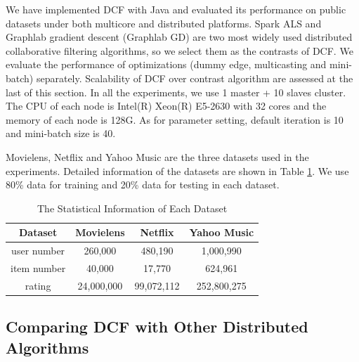 \documentclass{llncs}
\begin{document}
We have implemented DCF with Java and evaluated its performance on public datasets under both multicore and distributed platforms. Spark ALS \cite{SparkMllib} and Graphlab \cite{graphlab} gradient descent (Graphlab GD) are two most widely used distributed collaborative filtering algorithms, so we select them as the contrasts of DCF. We evaluate the performance of optimizations (dummy edge, multicasting and mini-batch) separately. Scalability of DCF over contrast algorithm are assessed at the last of this section. In all the experiments, we use 1 master + 10 slaves cluster. The CPU of each node is Intel(R) Xeon(R) E5-2630 with 32 cores and the memory of each node is 128G. As for parameter setting, default iteration is 10 and mini-batch size is 40.

Movielens, Netflix and Yahoo Music are the three datasets used in the experiments. Detailed information of the datasets are shown in Table \ref{tab:dataset}. We use 80\% data for training and 20\% data for testing in each dataset.

\vspace{-15pt}
\begin{table}[!htb]
\renewcommand{\arraystretch}{1.3}
\caption{The Statistical Information of Each Dataset}
\vspace{-5pt}
\label{tab:dataset}
\centering
\begin{tabular}{|c|c|c|c|}
\hline
\textbf{Dataset} & Movielens & Netflix & Yahoo Music\\
\hline
user number & 260,000 & 480,190 & 1,000,990\\
\hline
item number & 40,000 & 17,770 & 624,961\\
\hline
rating & 24,000,000 & 99,072,112 & 252,800,275\\
\hline
\end{tabular}
\vspace{-35pt}
\end{table}

\subsection{Comparing DCF with Other Distributed Algorithms}
\vspace{-5pt}
\label{sub:dcf}
\end{document}
